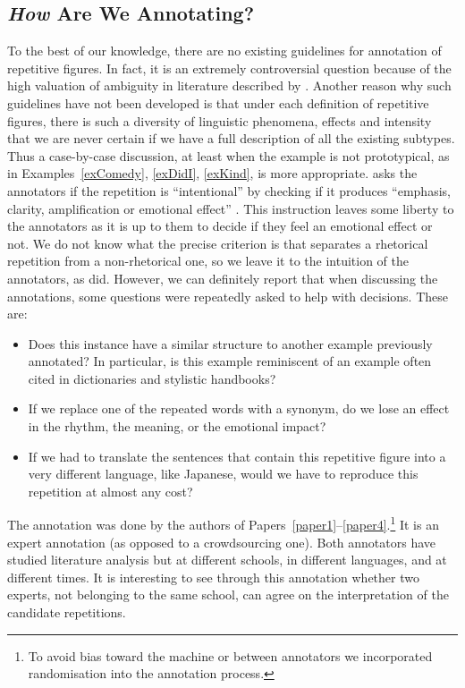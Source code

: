 \subsection{\textit{How} Are We Annotating?\label{secHowAnnot}}
To the best of our knowledge, there are no existing guidelines for annotation of repetitive figures. In fact, it is an extremely controversial question because of the high valuation of ambiguity in literature described by \cite{hammond2013}. Another reason why such guidelines have not been developed is that under each definition of repetitive figures, there is such a diversity of linguistic phenomena, effects and intensity that we are never certain if we have a full description of all the existing subtypes. Thus a case-by-case discussion, at least when the example is not prototypical, as in Examples~\ref{exComedy}, \ref{exDidI}, \ref{exKind}, is more appropriate. \cite{Strommer2011} asks the annotators if the repetition is ``intentional'' by checking if it produces ``emphasis, clarity, amplification or emotional effect'' \citep[p. 40]{Strommer2011}. This instruction leaves some liberty to the annotators as it is up to them to decide if they feel an emotional effect or not. We do not know what the precise criterion is that separates a rhetorical repetition from a non-rhetorical one, so we leave it to the intuition of the annotators, as \cite{Strommer2011} did. However, we can definitely report that when discussing the annotations, some questions were repeatedly asked to help with decisions. These are:
\begin{itemize}
\item Does this instance have a similar structure to another example previously annotated? In particular, is this example reminiscent of an example often cited in dictionaries and stylistic handbooks?
\item If we replace one of the repeated words with a synonym, do we lose an effect in the rhythm, the meaning, or the emotional impact? 
\item  If we had to translate the sentences that contain this repetitive figure into a very different language, like Japanese, would we have to reproduce this repetition at almost any cost?
\end{itemize} 
\noindent
\noindent
The annotation was done by the authors of Papers~\ref{paper1}--\ref{paper4}.\footnote{To avoid bias toward the machine or between annotators we incorporated randomisation into the annotation process.} It is an expert annotation (as opposed to a crowdsourcing one). Both annotators have studied literature analysis but at different schools, in different languages, and at different times. It is interesting to see through this annotation whether two experts, not belonging to the same school, can agree on the interpretation of the candidate repetitions.
